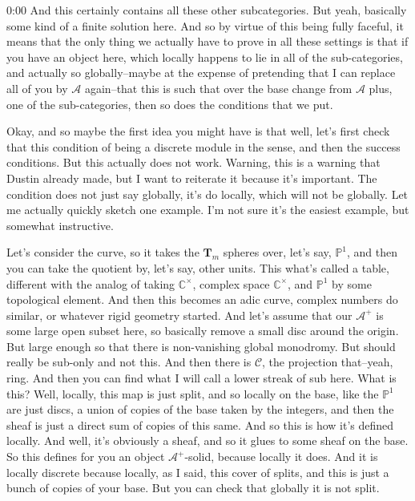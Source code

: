 \begin{unfinished}{0:00}
And this certainly contains all these other subcategories. But yeah, basically some kind of a finite solution here. And so by virtue of this being fully faceful, it means that the only thing we actually have to prove in all these settings is that if you have an object here, which locally happens to lie in all of the sub-categories, and actually so globally--maybe at the expense of pretending that I can replace all of you by $\mathcal{A}$ again--that this is such that over the base change from $\mathcal{A}$ plus, one of the sub-categories, then so does the conditions that we put.

Okay, and so maybe the first idea you might have is that well, let's first check that this condition of being a discrete module in the sense, and then the success conditions. But this actually does not work. Warning, this is a warning that Dustin already made, but I want to reiterate it because it's important. The condition does not just say globally, it's do locally, which will not be globally. Let me actually quickly sketch one example. I'm not sure it's the easiest example, but somewhat instructive.

Let's consider the curve, so it takes the $\mathbf{T}_m$ spheres over, let's say, $\mathbb{P}^1$, and then you can take the quotient by, let's say, other units. This what's called a table, different with the analog of taking $\mathbb{C}^\times$, complex space $\mathbb{C}^\times$, and $\mathbb{P}^1$ by some topological element. And then this becomes an adic curve, complex numbers do similar, or whatever rigid geometry started. And let's assume that our $\mathcal{A}^+$ is some large open subset here, so basically remove a small disc around the origin. But large enough so that there is non-vanishing global monodromy. But should really be sub-only and not this. And then there is $\mathcal{C}$, the projection that--yeah, ring. And then you can find what I will call a lower streak of sub here. What is this? Well, locally, this map is just split, and so locally on the base, like the $\mathbb{P}^1$ are just discs, a union of copies of the base taken by the integers, and then the sheaf is just a direct sum of copies of this same. And so this is how it's defined locally. And well, it's obviously a sheaf, and so it glues to some sheaf on the base. So this defines for you an object $\mathcal{A}^+$-solid, because locally it does. And it is locally discrete because locally, as I said, this cover of splits, and this is just a bunch of copies of your base. But you can check that globally it is not split.


\end{unfinished}

